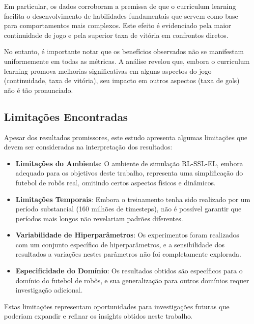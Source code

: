 Em particular, os dados corroboram a premissa de que o curriculum learning facilita o desenvolvimento de habilidades fundamentais que servem como base para comportamentos mais complexos. Este efeito é evidenciado pela maior continuidade de jogo e pela superior taxa de vitória em confrontos diretos.

No entanto, é importante notar que os benefícios observados não se manifestam uniformemente em todas as métricas. A análise revelou que, embora o curriculum learning promova melhorias significativas em alguns aspectos do jogo (continuidade, taxa de vitória), seu impacto em outros aspectos (taxa de gols) não é tão pronunciado.

\subsection{Limitações Encontradas}

Apesar dos resultados promissores, este estudo apresenta algumas limitações que devem ser consideradas na interpretação dos resultados:

\begin{itemize}
    \item \textbf{Limitações do Ambiente}: O ambiente de simulação RL-SSL-EL, embora adequado para os objetivos deste trabalho, representa uma simplificação do futebol de robôs real, omitindo certos aspectos físicos e dinâmicos.
    
    \item \textbf{Limitações Temporais}: Embora o treinamento tenha sido realizado por um período substancial (160 milhões de timesteps), não é possível garantir que períodos mais longos não revelariam padrões diferentes.
    
    \item \textbf{Variabilidade de Hiperparâmetros}: Os experimentos foram realizados com um conjunto específico de hiperparâmetros, e a sensibilidade dos resultados a variações nestes parâmetros não foi completamente explorada.
    
    \item \textbf{Especificidade do Domínio}: Os resultados obtidos são específicos para o domínio do futebol de robôs, e sua generalização para outros domínios requer investigação adicional.
\end{itemize}

Estas limitações representam oportunidades para investigações futuras que poderiam expandir e refinar os insights obtidos neste trabalho.

